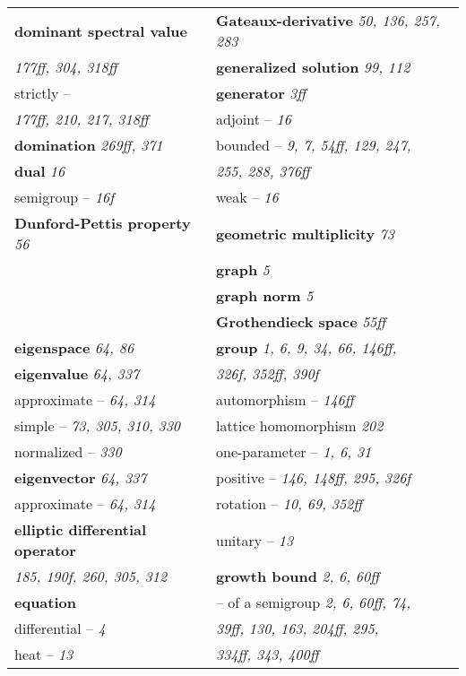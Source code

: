 \documentclass{article}
\begin{document}
\begin{longtable}{p{}p{}}
\textbf{dominant spectral value} & \textbf{Gateaux-derivative} \textit{50, 136, 257, 283} \\
\quad \textit{177ff, 304, 318ff} & \textbf{generalized solution} \textit{99, 112} \\
\quad strictly -- & \textbf{generator} \textit{3ff} \\
\quad\quad \textit{177ff, 210, 217, 318ff} & \quad adjoint -- \textit{16} \\
\textbf{domination} \textit{269ff, 371} & \quad bounded -- \textit{9, 7, 54ff, 129, 247,} \\
\textbf{dual} \textit{16} & \quad\quad \textit{255, 288, 376ff} \\
\quad semigroup -- \textit{16f} & \quad weak -- \textit{16} \\
\textbf{Dunford-Pettis property} \textit{56} & \textbf{geometric multiplicity} \textit{73} \\
& \textbf{graph} \textit{5} \\
& \textbf{graph norm} \textit{5} \\
& \textbf{Grothendieck space} \textit{55ff} \\
\textbf{eigenspace} \textit{64, 86} & \textbf{group} \textit{1, 6, 9, 34, 66, 146ff,} \\
\textbf{eigenvalue} \textit{64, 337} & \quad\quad \textit{326f, 352ff, 390f} \\
\quad approximate -- \textit{64, 314} & \quad automorphism -- \textit{146ff} \\
\quad simple -- \textit{73, 305, 310, 330} & \quad lattice homomorphism \textit{202} \\
\quad normalized -- \textit{330} & \quad one-parameter -- \textit{1, 6, 31} \\
\textbf{eigenvector} \textit{64, 337} & \quad positive -- \textit{146, 148ff, 295, 326f} \\
\quad approximate -- \textit{64, 314} & \quad rotation -- \textit{10, 69, 352ff} \\
\textbf{elliptic differential operator} & \quad unitary -- \textit{13} \\
\quad \textit{185, 190f, 260, 305, 312} & \textbf{growth bound} \textit{2, 6, 60ff} \\
\textbf{equation} & \quad -- of a semigroup \textit{2, 6, 60ff, 74,} \\
\quad differential -- \textit{4} & \quad\quad \textit{39ff, 130, 163, 204ff, 295,} \\
\quad heat -- \textit{13} & \quad\quad \textit{334ff, 343, 400ff} \\

\end{longtable}
\end{document}
